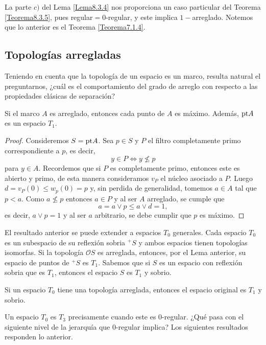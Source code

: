 La parte $c)$ del Lema \ref{Lema8.3.4} nos proporciona un caso particular del Teorema \ref{Teorema8.3.5}, pues regular$=0$-regular, y este implica $1-$arreglado. Notemos que lo anterior es el Teorema \ref{Teorema7.1.4}.

\subsection{Topologías arregladas}

Teniendo en cuenta que la topología de un espacio es un marco, resulta natural el preguntarnos, ¿cuál es el comportamiento del grado de arreglo con respecto a las propiedades clásicas de separación?

\begin{lem}\label{Lema8.4.1}
    Si el marco $A$ es arreglado, entonces cada punto de $A$ es máximo. Además, $\mathrm{pt} A$ es un espacio $T_1$.
\end{lem}

\begin{proof}
    Consideremos $S=\mathrm{pt} A$. Sea $p\in S$ y $P$ el filtro completamente primo correspondiente a $p$, es decir, 
    \[
    y\in P\Leftrightarrow y\nleq p
    \]
    para $y\in A$. Recordemos que si $P$ es completamente primo, entonces este es abierto y primo, de esta manera consideramos $v_P$ el núcleo asociado a $P$. Luego $d=v_P(0)\leq w_p(0)=p$ y, sin perdida de generalidad, tomemos $a\in A$ tal que $p< a$. Como $a\nleq p$ entonces $a\in P$ y al ser $A$ arreglado, se cumple que 
    \[
    a=a\vee p\leq a\vee d=1,
    \]
    es decir, $a\vee p=1$ y al ser $a$ arbitrario, se debe cumplir que $p$ es máximo.
\end{proof}

El resultado anterior se puede extender a espacios $T_0$ generales. Cada espacio $T_0$ es un subespacio de su reflexión sobria $^+S$ y ambos espacios tienen topologías isomorfas. Si la topología $\mathcal{O}S$ es arreglada, entonces, por el Lema anterior, su espacio de puntos de $^+S$ es $T_1$. Sabemos que si $S$ es un espacio con reflexión sobria que es $T_1$, entonces el espacio $S$ es $T_1$ y sobrio.

\begin{lem}\label{Lema8.4.2}
    Si un espacio $T_0$ tiene una topología arreglada, entonces el espacio original es $T_1$ y sobrio.
\end{lem}

Un espacio $T_0$ es $T_3$ precisamente cuando este es $0$-regular. ¿Qué pasa con el siguiente nivel de la jerarquía que $0$-regular implica? Los siguientes resultados responden lo anterior. 

